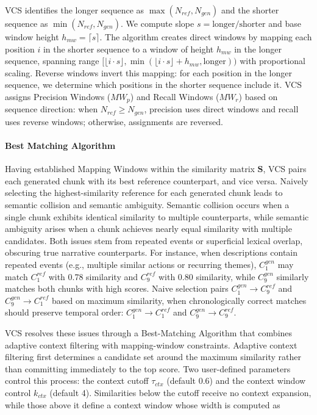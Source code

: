 \documentclass[letterpaper]{article} %
\begin{document}
VCS identifies the longer sequence as $\max(N_{ref}, N_{gen})$ and the shorter sequence as $\min(N_{ref}, N_{gen})$. We compute slope $s = \text{longer}/\text{shorter}$ and base window height $h_{mw} = \lceil s \rceil$. The algorithm creates direct windows by mapping each position $i$ in the shorter sequence to a window of height $h_{mw}$ in the longer sequence, spanning range $[\lfloor i \cdot s \rfloor, \min(\lfloor i \cdot s \rfloor + h_{mw}, \text{longer}))$ with proportional scaling. Reverse windows invert this mapping: for each position in the longer sequence, we determine which positions in the shorter sequence include it. VCS assigns Precision Windows ($MW_p$) and Recall Windows ($MW_r$) based on sequence direction: when $N_{ref} \geq N_{gen}$, precision uses direct windows and recall uses reverse windows; otherwise, assignments are reversed.

\paragraph{Best Matching Algorithm}
Having established Mapping Windows within the similarity matrix $\mathbf{S}$, VCS pairs each generated chunk with its best reference counterpart, and vice versa. Naively selecting the highest-similarity reference for each generated chunk leads to semantic collision and semantic ambiguity. Semantic collision occurs when a single chunk exhibits identical similarity to multiple counterparts, while semantic ambiguity arises when a chunk achieves nearly equal similarity with multiple candidates. Both issues stem from repeated events or superficial lexical overlap, obscuring true narrative counterparts. For instance, when descriptions contain repeated events (e.g., multiple similar actions or recurring themes), $C_1^{gen}$ may match $C_1^{ref}$ with 0.78 similarity and $C_9^{ref}$ with 0.80 similarity, while $C_9^{gen}$ similarly matches both chunks with high scores. Naive selection pairs $C_1^{gen} \rightarrow C_9^{ref}$ and $C_9^{gen} \rightarrow C_1^{ref}$ based on maximum similarity, when chronologically correct matches should preserve temporal order: $C_1^{gen} \rightarrow C_1^{ref}$ and $C_9^{gen} \rightarrow C_9^{ref}$.

VCS resolves these issues through a Best-Matching Algorithm that combines adaptive context filtering with mapping-window constraints. Adaptive context filtering first determines a candidate set around the maximum similarity rather than committing immediately to the top score. Two user-defined parameters control this process: the context cutoff $\tau_{ctx}$ (default 0.6) and the context window control $k_{ctx}$ (default 4). Similarities below the cutoff receive no context expansion, while those above it define a context window whose width is computed as
\end{document}
